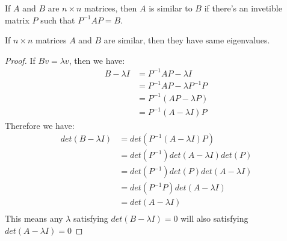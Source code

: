 \begin{definition}[Similarity]
    If \(A\) and \(B\) are \(n \times n\) matrices,  
    then \(A\) is similar to \(B\)
    if there's an invetible matrix \(P\) such that \(P^{-1} A P = B\). 
\end{definition}

\begin{theorem}
   If \(n \times n\) matrices \(A\) and \(B\) are similar, then they have same eigenvalues.    
\end{theorem}
\begin{proof}
    If \(B v = \lambda v\), then we have:
    \begin{align*}
        B - \lambda I 
            &= P^{-1} A P - \lambda I \\ 
            &= P^{-1} A P - \lambda P^{-1} P \\ 
            &= P^{-1} (A P - \lambda P) \\ 
            &= P^{-1} (A - \lambda I) P  
    \end{align*}
    Therefore we have:
    \begin{align*}
        det(B - \lambda I) 
            &= det(P^{-1} (A - \lambda I) P) \\
            &= det(P^{-1}) det(A - \lambda I) det(P) \\
            &= det(P^{-1}) det(P) det(A - \lambda I) \\
            &= det(P^{-1} P) det(A - \lambda I) \\
            &= det(A - \lambda I) \\
    \end{align*}
    This means any \(\lambda\) satisfying \(det(B - \lambda I) = 0\) will also satisfying \(det(A - \lambda I) = 0\) 
\end{proof}

